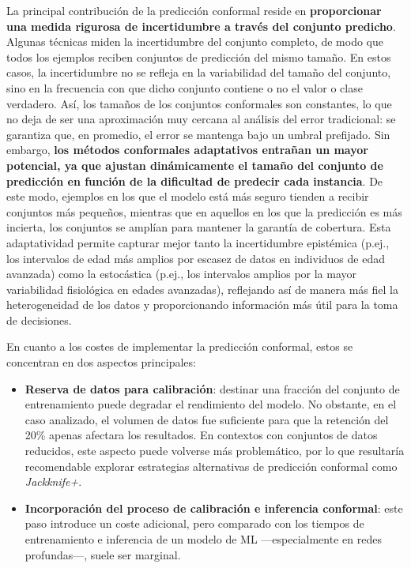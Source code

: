 
La principal contribución de la predicción conformal reside en \textbf{proporcionar una medida rigurosa de incertidumbre a través del conjunto predicho}. Algunas técnicas miden la incertidumbre del conjunto completo, de modo que todos los ejemplos reciben conjuntos de predicción del mismo tamaño. En estos casos, la incertidumbre no se refleja en la variabilidad del tamaño del conjunto, sino en la frecuencia con que dicho conjunto contiene o no el valor o clase verdadero. Así, los tamaños de los conjuntos conformales son constantes, lo que no deja de ser una aproximación muy cercana al análisis del error tradicional: se garantiza que, en promedio, el error se mantenga bajo un umbral prefijado.
Sin embargo, \textbf{los métodos conformales adaptativos entrañan un mayor potencial, ya que ajustan dinámicamente el tamaño del conjunto de predicción en función de la dificultad de predecir cada instancia}. De este modo, ejemplos en los que el modelo está más seguro tienden a recibir conjuntos más pequeños, mientras que en aquellos en los que la predicción es más incierta, los conjuntos se amplían para mantener la garantía de cobertura. 
Esta adaptatividad permite capturar mejor tanto la incertidumbre epistémica (p.ej., los intervalos de edad más amplios por escasez de datos en individuos de edad avanzada) como la estocástica (p.ej., los intervalos amplios por la mayor variabilidad fisiológica en edades avanzadas), reflejando así de manera más fiel la heterogeneidad de los datos y proporcionando información más útil para la toma de decisiones.



En cuanto a los costes de implementar la predicción conformal, estos se concentran en dos aspectos principales:

\begin{itemize}

    \item \textbf{Reserva de datos para calibración}: destinar una fracción del conjunto de entrenamiento puede degradar el rendimiento del modelo. No obstante, en el caso analizado, el volumen de datos fue suficiente para que la retención del 20\% apenas afectara los resultados. En contextos con conjuntos de datos reducidos, este aspecto puede volverse más problemático, por lo que resultaría recomendable explorar estrategias alternativas de predicción conformal como \textit{Jackknife+}. 
    
    \item \textbf{Incorporación del proceso de calibración e inferencia conformal}: este paso introduce un coste adicional, pero comparado con los tiempos de entrenamiento e inferencia de un modelo de ML ---especialmente en redes profundas---, suele ser marginal.

\end{itemize}


